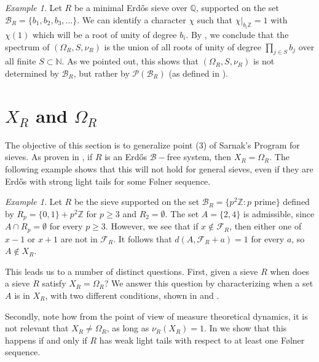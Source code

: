 \documentclass[a4paper,11pt,reqno]{amsart}
\theoremstyle{plain}
\theoremstyle{remark}
\newtheorem{example}[theorem]{Example}
\newcommand{\q}{\mathbb{Q}}
\newcommand{\z}{\mathbb{Z}}
\newcommand{\cb}{\mathcal{B}}
\newcommand{\cp}{\mathcal{P}}
\newcommand{\fr}{\mathcal{F}_R}
\begin{document}
			\begin{example}
				Let $R$ be a minimal Erdős sieve over $\q$, supported on the set $\cb_R= \{b_1,b_2,b_3,\dots\}$. We can identify a character $\chi$ such that $\chi \vert_{b_i\z} = 1$ with $\chi(1)$ which will be a root of unity of degree $b_i$. By  , we conclude that the spectrum of  $(\Omega_R,S, \nu_R)$ is the union of all roots of unity of degree $\prod_{j \in S}b_j$ over all finite  $S \subset \mathbb{N}$. As we pointed out, this shows that  $(\Omega_R,S, \nu_R)$ is not determined by $\cb_R$, but rather by $\cp(\cb_R)$ (as defined in ).
			\end{example}
			
			
			
			
			
			
			\section{$X_R$ and  $\Omega_{R}$}
			
			
			The objective of this section is to generalize point (3) of Sarnak's Program for sieves. As proven in \cite{Bartnicka}, if  $R$ is an Erdős $\cb-$free system, then $X_R = \Omega_R$. The following example shows that this will not hold for general sieves, even if they are Erdős with strong light tails for some Følner sequence.
			
			\begin{example}
				\label{ex: sieve such that X different Omega}
				Let $R$ be the sieve supported on the set $\cb_R = \{p^2\z:p \text{ prime}\}$ defined by $R_p = \{0,1\}+p^2\z$ for $p\geq 3$ and $R_2 = \emptyset$. The set $A = \{2,4\}$ is admissible, since $A\cap R_p = \emptyset$ for every $p \geq 3$. However, we see that if $x \not \in \fr$, then either one of $x-1$ or $x+1$ are not in $\fr$. It follows that $d(A,\fr+a) = 1$ for every $a$, so $A \not \in X_R$. 
			\end{example}
			
			This leads us to a number of distinct questions. First, given a sieve $R$ when does a sieve $R$ satisfy $X_R = \Omega_R$? We answer this question by characterizing when a set $A$ is in $X_R$, with two different conditions, shown in   and  . 
			
			
			Secondly, note how from the point of view of measure theoretical dynamics, it is not relevant that $X_R \neq \Omega_R$, as long as $\nu_R(X_R) =1 $. In  we show that this happens if and only if $R$ has weak light tails with respect to at least one Følner sequence.
			
\end{document}
